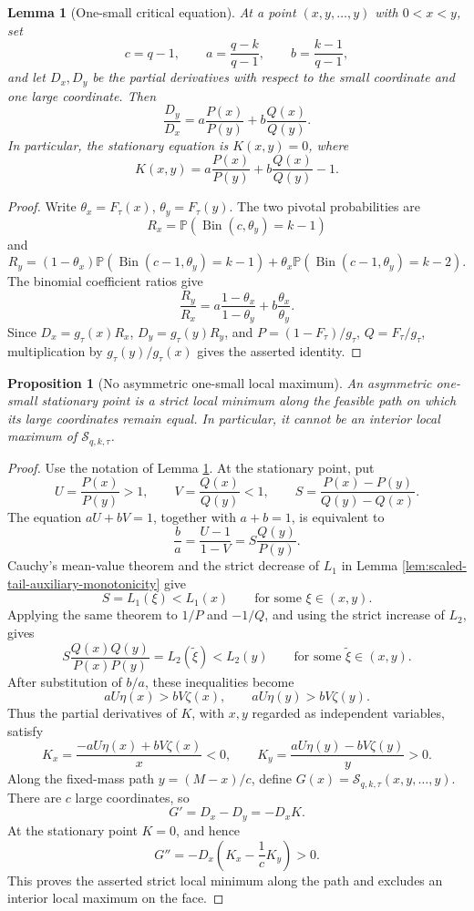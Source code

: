 \documentclass[11pt]{article}
\newtheorem{lemma}{Lemma}
\newtheorem{proposition}{Proposition}
\theoremstyle{definition}
\theoremstyle{remark}
\DeclareMathOperator{\Bin}{Bin}
\newcommand{\Pbb}{\mathbb P}
\newcommand{\1}{\mathbf 1}
\begin{document}
\begin{lemma}[One-small critical equation]
\label{lem:one-small-critical-equation}
At a point \((x,y,\ldots,y)\) with \(0<x<y\), set
\[
  c=q-1,\qquad
  a=\frac{q-k}{q-1},\qquad
  b=\frac{k-1}{q-1},
\]
and let \(D_x,D_y\) be the partial derivatives with respect to the small coordinate and one large coordinate.  Then
\[
  \frac{D_y}{D_x}
  =a\frac{P(x)}{P(y)}+b\frac{Q(x)}{Q(y)}.
\]
In particular, the stationary equation is \(K(x,y)=0\), where
\[
  K(x,y)=a\frac{P(x)}{P(y)}+b\frac{Q(x)}{Q(y)}-1.
\]
\end{lemma}

\begin{proof}
Write \(\theta_x=F_\tau(x)\), \(\theta_y=F_\tau(y)\).  The two pivotal probabilities are
\[
  R_x=\Pbb(\Bin(c,\theta_y)=k-1)
\]
and
\[
  R_y=(1-\theta_x)\Pbb(\Bin(c-1,\theta_y)=k-1)
      +\theta_x\Pbb(\Bin(c-1,\theta_y)=k-2).
\]
The binomial coefficient ratios give
\[
  \frac{R_y}{R_x}
  =a\frac{1-\theta_x}{1-\theta_y}
    +b\frac{\theta_x}{\theta_y}.
\]
Since \(D_x=g_\tau(x)R_x\), \(D_y=g_\tau(y)R_y\), and
\(P=(1-F_\tau)/g_\tau\), \(Q=F_\tau/g_\tau\), multiplication by \(g_\tau(y)/g_\tau(x)\) gives the asserted identity.
\end{proof}

\begin{proposition}[No asymmetric one-small local maximum]
\label{prop:no-one-small-local-max}
An asymmetric one-small stationary point is a strict local minimum along the feasible path on which its large coordinates remain equal.  In particular, it cannot be an interior local maximum of \(\mathcal S_{q,k,\tau}\).
\end{proposition}

\begin{proof}
Use the notation of Lemma \ref{lem:one-small-critical-equation}.  At the stationary point, put
\[
  U=\frac{P(x)}{P(y)}>1,
  \qquad
  V=\frac{Q(x)}{Q(y)}<1,
  \qquad
  S=\frac{P(x)-P(y)}{Q(y)-Q(x)}.
\]
The equation \(aU+bV=1\), together with \(a+b=1\), is equivalent to
\[
  \frac ba=\frac{U-1}{1-V}
          =S\frac{Q(y)}{P(y)}.
\]
Cauchy's mean-value theorem and the strict decrease of \(L_1\) in Lemma \ref{lem:scaled-tail-auxiliary-monotonicity} give
\[
  S=L_1(\xi)<L_1(x)
  \qquad\text{for some }\xi\in(x,y).
\]
Applying the same theorem to \(1/P\) and \(-1/Q\), and using the strict increase of \(L_2\), gives
\[
  S\frac{Q(x)Q(y)}{P(x)P(y)}
  =L_2(\widetilde\xi)<L_2(y)
  \qquad\text{for some }\widetilde\xi\in(x,y).
\]
After substitution of \(b/a\), these inequalities become
\[
  aU\eta(x)>bV\zeta(x),
  \qquad
  aU\eta(y)>bV\zeta(y).
\]
Thus the partial derivatives of \(K\), with \(x,y\) regarded as independent variables, satisfy
\[
  K_x=\frac{-aU\eta(x)+bV\zeta(x)}x<0,
  \qquad
  K_y=\frac{aU\eta(y)-bV\zeta(y)}y>0.
\]
Along the fixed-mass path \(y=(M-x)/c\), define
\(G(x)=\mathcal S_{q,k,\tau}(x,y,\ldots,y)\).  There are \(c\) large coordinates, so
\[
  G'=D_x-D_y=-D_xK.
\]
At the stationary point \(K=0\), and hence
\[
  G''=-D_x\left(K_x-\frac1cK_y\right)>0.
\]
This proves the asserted strict local minimum along the path and excludes an interior local maximum on the face.
\end{proof}
\end{document}
